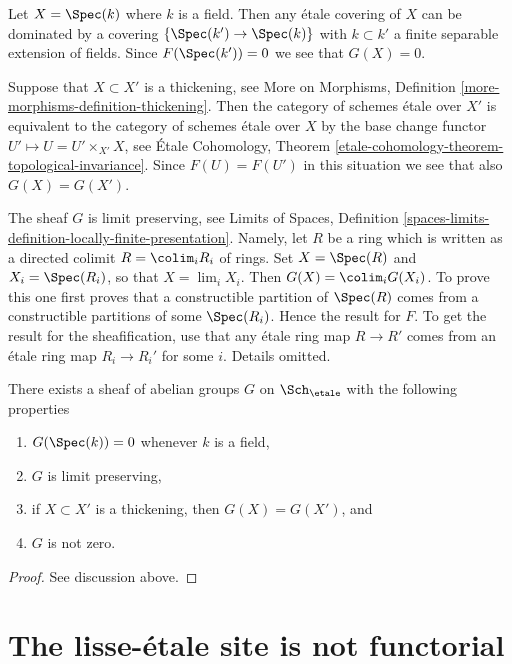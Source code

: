\medskip\noindent
Let $X = \Spec(k)$ where $k$ is a field.
Then any \'etale covering of $X$ can be dominated
by a covering $\{\Spec(k') \to \Spec(k)\}$ with $k \subset k'$
a finite separable extension of fields. Since $F(\Spec(k')) = 0$
we see that $G(X) = 0$.

\medskip\noindent
Suppose that $X \subset X'$ is a thickening, see
More on Morphisms, Definition \ref{more-morphisms-definition-thickening}.
Then the category of schemes \'etale over $X'$ is equivalent to the
category of schemes \'etale over $X$ by the base change functor
$U' \mapsto U = U' \times_{X'} X$, see
\'Etale Cohomology,
Theorem \ref{etale-cohomology-theorem-topological-invariance}.
Since $F(U) = F(U')$ in this situation we see that also $G(X) = G(X')$.

\medskip\noindent
The sheaf $G$ is limit preserving, see
Limits of Spaces,
Definition \ref{spaces-limits-definition-locally-finite-presentation}.
Namely, let $R$ be a ring which is written as a directed colimit
$R = \colim_i R_i$ of rings. Set $X = \Spec(R)$ and
$X_i = \Spec(R_i)$, so that $X = \lim_i X_i$. Then
$G(X) = \colim_i G(X_i)$. To prove this one first proves that
a constructible partition of $\Spec(R)$ comes from a constructible
partitions of some $\Spec(R_i)$. Hence the result for $F$. To
get the result for the sheafification, use that any \'etale ring map
$R \to R'$ comes from an \'etale ring map $R_i \to R_i'$ for some $i$.
Details omitted.

\begin{lemma}
\label{lemma-weird-sheaf}
There exists a sheaf of abelian groups $G$ on
$\Sch_\etale$ with the following properties
\begin{enumerate}
\item $G(\Spec(k)) = 0$ whenever $k$ is a field,
\item $G$ is limit preserving,
\item if $X \subset X'$ is a thickening, then $G(X) = G(X')$, and
\item $G$ is not zero.
\end{enumerate}
\end{lemma}

\begin{proof}
See discussion above.
\end{proof}




\section{The lisse-\'etale site is not functorial}
\label{section-lisse-etale-not-functorial}

